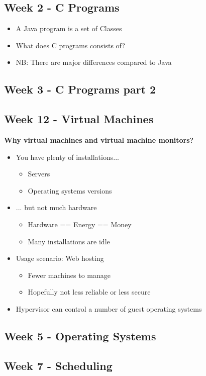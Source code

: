 
\subsection*{Week 2 - C Programs}
\begin{itemize}
\item A Java program is a set of Classes
\item What does C programs consists of?
\item NB: There are major differences compared to Java
\end{itemize}


\subsection*{Week 3 - C Programs part 2}






\subsection*{Week 12 - Virtual Machines}
\textbf{Why virtual machines and virtual machine monitors?}

\begin{itemize}
	\item You have plenty of installations...
	\begin{itemize}
		\item Servers
		\item Operating systems versions
	\end{itemize}

	\item ... but not much hardware
	\begin{itemize}
		\item Hardware == Energy == Money
		\item Many installations are idle
	\end{itemize}
	\item Usage scenario: Web hosting
	\begin{itemize}
		\item Fewer machines to manage
		\item Hopefully not less reliable or less secure
	\end{itemize}
	\item Hypervisor can control a number of guest operating systems
\end{itemize}

\subsection*{Week 5 - Operating Systems}




\subsection*{Week 7 - Scheduling}

